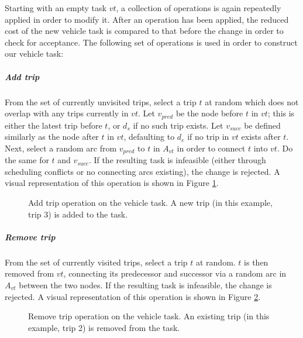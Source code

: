 \documentclass[]{article}
\begin{document}
Starting with an empty task $vt$, a collection of operations is again repeatedly applied in order to modify it. After an operation has been applied, the reduced cost of the new vehicle task is compared to that before the change in order to check for acceptance. The following set of operations is used in order to construct our vehicle task: 

\subparagraph{Add trip} From the set of currently unvisited trips, select a trip $t$ at random which does not overlap with any trips currently in $vt$. Let $v_{pred}$ be the node before $t$ in $vt$; this is either the latest trip before $t$, or $d_s$ if no such trip exists. Let $v_{succ}$ be defined similarly as the node after $t$ in $vt$, defaulting to $d_e$ if no trip in $vt$ exists after $t$. Next, select a random arc from $v_{pred}$ to $t$ in $A_{vt}$ in order to connect $t$ into $vt$. Do the same for $t$ and $v_{succ}$. If the resulting task is infeasible (either through scheduling conflicts or no connecting arcs existing), the change is rejected. A visual representation of this operation is shown in Figure \ref{fig:addtrip-vt}.

\begin{figure}[h]
  \centering
  \caption{Add trip operation on the vehicle task. A new trip (in this example, trip 3) is added to the task.}
  \label{fig:addtrip-vt}
\end{figure}

\subparagraph{Remove trip} From the set of currently visited trips, select a trip $t$ at random. $t$ is then removed from $vt$, connecting its predecessor and successor via a random arc in $A_{vt}$ between the two nodes. If the resulting task is infeasible, the change is rejected. A visual representation of this operation is shown in Figure \ref{fig:removetrip-vt}.

\begin{figure}[h]
  \centering
  \caption{Remove trip operation on the vehicle task. An existing trip (in this example, trip 2) is removed from the task.}
  \label{fig:removetrip-vt}
\end{figure}
 
\end{document}
